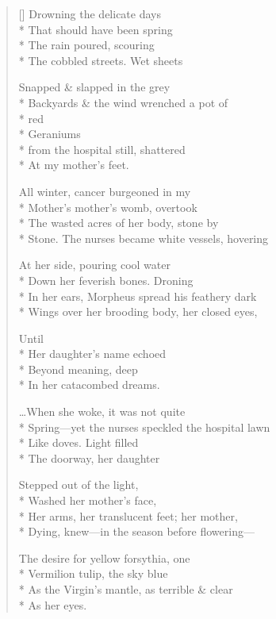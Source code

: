 \label{ch:springreturns}
\settowidth{\versewidth}{Stone. \qquad The nurses became white vessels, hovering}
\begin{verse}[\versewidth]
Drowning the delicate days\\*
That should have been spring\\*
The rain poured, scouring\\*
The cobbled streets. \qquad Wet sheets

Snapped \& slapped in the grey\\*
Backyards \& the wind wrenched a pot of\\*
\hspace*{7\vgap} red\\*
Geraniums\\*
\hfill from the hospital still, shattered\\*
At my mother's feet.

All winter, cancer burgeoned in my\\*
Mother's mother's womb, overtook\\*
The wasted acres of her body, stone by\\*
Stone. \qquad The nurses became white vessels, hovering

At her side, pouring cool water\\*
Down her feverish bones. \qquad Droning\\*
In her ears, Morpheus spread his feathery dark\\*
Wings over her brooding body, her closed eyes,

Until\\*
Her daughter's name echoed\\*
Beyond meaning, deep\\*
In her catacombed dreams.

\ldots When she woke, it was not quite\\*
Spring---yet the nurses speckled the hospital lawn\\*
Like doves. \qquad Light filled\\*
The doorway, her daughter

Stepped out of the light,\\*
Washed her mother's face,\\*
Her arms, her translucent feet; her mother,\\*
Dying, knew---in the season before flowering---

The desire for yellow forsythia, one\\*
Vermilion tulip, the sky blue\\*
As the Virgin's mantle, as terrible \& clear\\*
As her eyes.
\end{verse}
